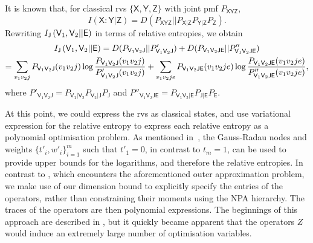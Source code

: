\documentclass[10pt, a4paper]{article}
\numberwithin{equation}{section} %
\theoremstyle{definition}
\theoremstyle{plain}
\newcommand{\?}{\mathrel{?}} %
\newcommand{\crv}[1]{\mathsf{#1}}
\begin{document}
                        It is known that, for classical rvs \(\{\crv{X}, \crv{Y}, \crv{Z}\}\) with joint pmf \(P_{\crv{XYZ}}\),
                        \begin{equation} I(\crv{X}:\crv{Y}|\crv{Z}) = D\left(P_{\crv{XYZ}}||P_{\crv{X}|\crv{Z}} P_{\crv{Y}|\crv{Z}} P_{\crv{Z}}\right). \end{equation}
                        Rewriting \(\splitkey{\crv{V}_1,\crv{V}_2}{\crv{E}}\) in terms of relative entropies, we obtain
                        \begin{gather}
                          \splitkey{\crv{V}_1,\crv{V}_2}{\crv{E}} =  D(P_{\crv{V}_1\crv{V}_2\crv{J}}||P'_{\crv{V}_1\crv{V}_2\crv{J}})
                          + D(P_{\crv{V}_1\crv{V}_2\crv{JE}}||P''_{\crv{V}_1\crv{V}_2\crv{JE}}) \\
                          = \sum_{v_1v_2j} P_{\crv{V}_1\crv{V}_2\crv{J}}(v_1v_2j) \log \frac{P_{\crv{V}_1\crv{V}_2\crv{J}}(v_1v_2j)}{P'_{\crv{V}_1\crv{V}_2\crv{J}}(v_1v_2j)} + \sum_{v_1v_2je} P_{\crv{V}_1\crv{V}_2\crv{JE}}(v_1v_2je) \log \frac{P_{\crv{V}_1\crv{V}_2\crv{JE}}(v_1v_2je)}{P''_{\crv{V}_1\crv{V}_2\crv{JE}}(v_1v_2je)},
                        \end{gather}
                        where \(P'_{\crv{V}_1\crv{V}_2\crv{J}} = P_{\crv{V_1|V_2}} P_{\crv{V}_2|\crv{J}} P_{\crv{J}}\) and \(P''_{\crv{V}_1\crv{V}_2\crv{JE}} = P_{\crv{V_1V_2|E}} P_{\crv{J|E}} P_{\crv{E}}\).

                        At this point, we could express the rvs as classical states, and use variational expression for the relative entropy  to express each relative entropy as a polynomial optimisation problem. As mentioned in~\cite[Remark 2.10]{BFF_QRE}, the Gauss-Radau nodes and weights \({\{t'_i, w'_i\}}_{i=1}^m\) such that \(t'_1 = 0\), in contrast to \(t_m = 1\), can be used to provide upper bounds for the logarithms, and therefore the relative entropies. In contrast to , which encounters the aforementioned outer approximation problem, we make use of our dimension bound to explicitly specify the entries of the operators, rather than constraining their moments using the NPA hierarchy. The traces of the operators are then polynomial expressions. The beginnings of this approach are described in , but it quickly became apparent that the operators \(Z\) would induce an extremely large number of optimisation variables.
\end{document}

